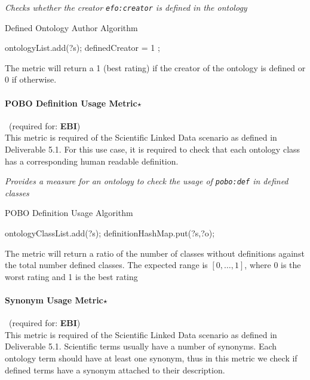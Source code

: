\begin{mdframed}[style=metricdefinition]
\emph{Checks whether the creator \texttt{efo:creator} is defined in the ontology}
\end{mdframed}

\begin{algorithm}
\caption{Defined Ontology Author Algorithm}
\begin{algorithmic}[1]
 ontologyList.add(?s); \EndIf
{} definedCreator = 1 ; \EndIf
\EndProcedure
\end{algorithmic}
\end{algorithm}

The metric will return a 1 (best rating) if the creator of the ontology is defined or 0 if otherwise.

\paragraph{POBO Definition Usage Metric$\star$}~(required for: \textbf{EBI})~\\ 
This metric is required of the Scientific Linked Data scenario as defined in Deliverable 5.1.
For this use case, it is required to check that each ontology class has a corresponding human readable definition.

\begin{mdframed}[style=metricdefinition]
\emph{Provides a measure for an ontology to check the usage of \texttt{pobo:def} in defined classes}
\end{mdframed}

\begin{algorithm}
\caption{POBO Definition Usage Algorithm}
\begin{algorithmic}[1]
 ontologyClassList.add(?s); \EndIf
{} 
\State definitionHashMap.put(?s,?o);
\EndIf
\EndProcedure
\end{algorithmic}
\end{algorithm}

The metric will return a ratio of the number of classes without definitions against the total number defined classes. The expected range is $[0,\ldots,1]$, where 0 is the worst rating and 1 is the best rating

\paragraph{Synonym Usage Metric$\star$}~(required for: \textbf{EBI})~\\ 
This metric is required of the Scientific Linked Data scenario as defined in Deliverable 5.1.
Scientific terms usually have a number of synonyms.
Each ontology term should have at least one synonym, thus in this metric we check if defined terms have a synonym attached to their description.

